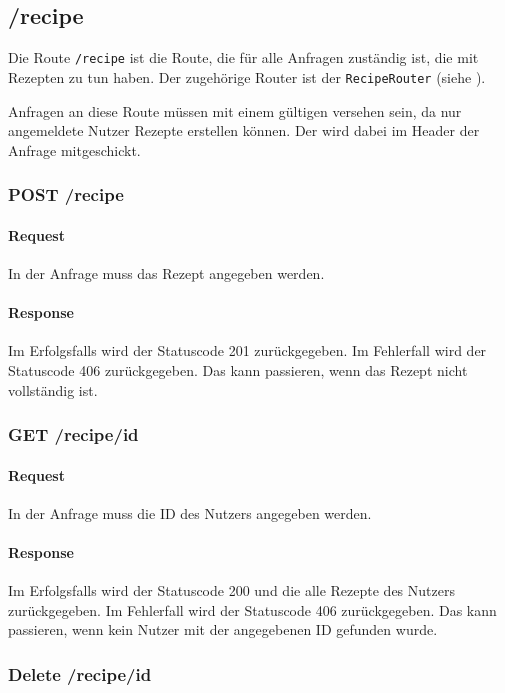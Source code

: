 \documentclass{entwurfsheft}
\begin{document}
\begin{sloppypar}
\subsection{/recipe}
Die Route \texttt{/recipe} ist die Route, die für alle Anfragen zuständig ist, die mit Rezepten zu tun haben.
Der zugehörige Router ist der \texttt{RecipeRouter} (siehe ).

Anfragen an diese Route müssen mit einem gültigen  versehen sein, da nur angemeldete Nutzer Rezepte erstellen können.
Der  wird dabei im Header der Anfrage mitgeschickt.

\subsubsection*{POST /recipe}
    \paragraph{Request}
        In der Anfrage muss das Rezept angegeben werden.
    \paragraph{Response}
        Im Erfolgsfalls wird der Statuscode 201 zurückgegeben.
        Im Fehlerfall wird der Statuscode 406 zurückgegeben. Das kann passieren, wenn das Rezept nicht vollständig ist.

\subsubsection*{GET /recipe/id}
    \paragraph{Request}
        In der Anfrage muss die ID des Nutzers angegeben werden.
    \paragraph{Response}
        Im Erfolgsfalls wird der Statuscode 200 und die alle Rezepte des Nutzers zurückgegeben.
        Im Fehlerfall wird der Statuscode 406 zurückgegeben. Das kann passieren, wenn kein Nutzer mit der angegebenen ID gefunden wurde.

\subsubsection*{Delete /recipe/id}

\end{sloppypar}
\end{document}
